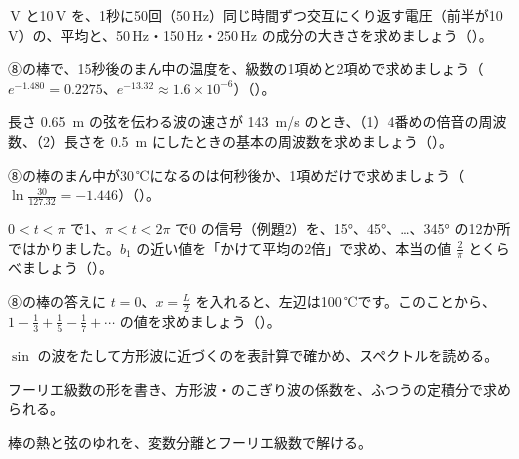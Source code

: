 \,V と10\,V を、1秒に50回（50\,Hz）同じ時間ずつ交互にくり返す電圧（前半が10\,V）の、平均と、50\,Hz・150\,Hz・250\,Hz の成分の大きさを求めましょう\mbox{（）}。

\bkproblem ⑧の棒で、15秒後のまん中の温度を、級数の1項めと2項めで求めましょう（$e^{-1.480}=0.2275$、$e^{-13.32}\approx1.6\times10^{-6}$）\mbox{（）}。

\bkproblem 長さ \qty{0.65}{m} の弦を伝わる波の速さが \qty{143}{m/s} のとき、（1）4番めの倍音の周波数、（2）長さを \qty{0.5}{m} にしたときの基本の周波数を求めましょう\mbox{（）}。


\bkproblem ⑧の棒のまん中が30\,℃になるのは何秒後か、1項めだけで求めましょう（$\ln\frac{30}{127.32}=-1.446$）\mbox{（）}。

\bkproblem $0<t<\pi$ で1、$\pi<t<2\pi$ で0 の信号（例題2）を、15°、45°、…、345° の12か所ではかりました。$b_1$ の近い値を「かけて平均の2倍」で求め、本当の値 $\frac{2}{\pi}$ とくらべましょう\mbox{（）}。

\bkproblem ⑧の棒の答えに $t=0$、$x=\frac{L}{2}$ を入れると、左辺は100\,℃です。このことから、$1-\frac13+\frac15-\frac17+\cdots$ の値を求めましょう\mbox{（）}。

\begin{furikaeri}
\begin{checklist}
\item $\sin$ の波をたして方形波に近づくのを表計算で確かめ、スペクトルを読める。
\item フーリエ級数の形を書き、方形波・のこぎり波の係数を、ふつうの定積分で求められる。
\item 棒の熱と弦のゆれを、変数分離とフーリエ級数で解ける。
\end{checklist}
\end{furikaeri}


